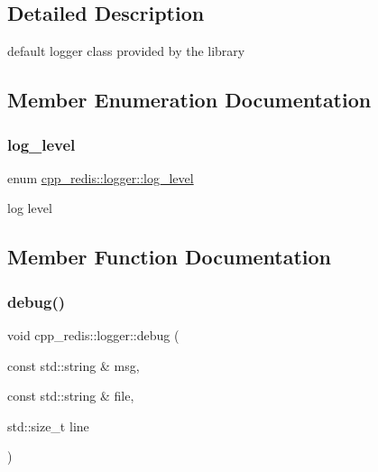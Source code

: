 \subsection{Detailed Description}
default logger class provided by the library 

\subsection{Member Enumeration Documentation}
\mbox{\label{classcpp__redis_1_1logger_a9493594d547e7abe71b8690be1946c7a}} 
\subsubsection{\texorpdfstring{log\+\_\+level}{log\_level}}
{\footnotesize\ttfamily enum \hyperlink{classcpp__redis_1_1logger_a9493594d547e7abe71b8690be1946c7a}{cpp\+\_\+redis\+::logger\+::log\+\_\+level}\hspace{0.3cm}{\ttfamily [strong]}}

log level 

\subsection{Member Function Documentation}
\mbox{\label{classcpp__redis_1_1logger_a36e0908e7b05850b663a4b8b9cdbc299}} 
\subsubsection{\texorpdfstring{debug()}{debug()}}
{\footnotesize\ttfamily void cpp\+\_\+redis\+::logger\+::debug (\begin{DoxyParamCaption}\item[{const std\+::string \&}]{msg,  }\item[{const std\+::string \&}]{file,  }\item[{std\+::size\+\_\+t}]{line }\end{DoxyParamCaption})\hspace{0.3cm}{\ttfamily [virtual]}}

